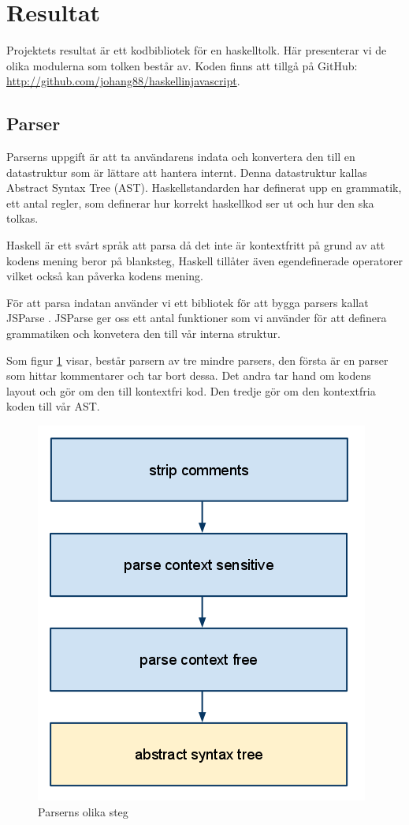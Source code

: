 \section{Resultat}

Projektets resultat är ett kodbibliotek för en haskelltolk. Här presenterar vi de olika modulerna som tolken består av. Koden finns att tillgå på GitHub: \url{http://github.com/johang88/haskellinjavascript}.

\subsection{Parser} 
Parserns uppgift är att ta användarens indata och konvertera den till en datastruktur 
som är lättare att hantera internt. Denna datastruktur kallas Abstract Syntax Tree (AST). 
Haskellstandarden har definerat upp en grammatik, ett antal regler, som definerar hur korrekt haskellkod ser ut och hur den ska tolkas.

Haskell är ett svårt språk att parsa då det inte är kontextfritt på grund av att kodens mening beror på blanksteg, 
Haskell tillåter även egendefinerade operatorer vilket också kan påverka kodens mening. 

För att parsa indatan använder vi ett bibliotek för att bygga parsers kallat JSParse \citep{jsparse}.
JSParse ger oss ett antal funktioner som vi använder för att definera grammatiken och konvetera den till vår interna struktur.

Som figur \ref{fig:parser_steg} visar, består parsern av tre mindre parsers, den första är en parser som hittar kommentarer och tar bort dessa. 
Det andra tar hand om kodens layout och gör om den till kontextfri kod. Den tredje gör om den kontextfria koden till vår AST.

\begin{figure}[H]
    \begin{center}
        \includegraphics[width=.5\textwidth]{parser_1.png}
        \caption{Parserns olika steg}
        \label{fig:parser_steg} %
    \end{center}
\end{figure}

